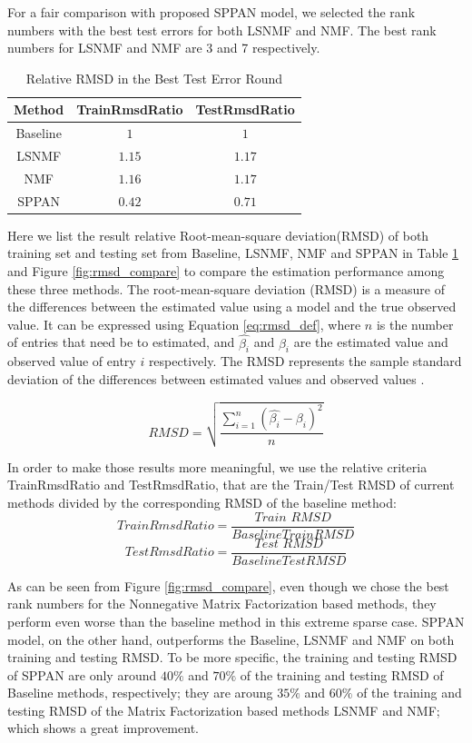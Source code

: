 For a fair comparison with proposed SPPAN model, we selected the rank
numbers with the best test errors for both LSNMF and NMF. The best
rank numbers for LSNMF and NMF are 3 and 7 respectively.

\begin{table}[!ht]
\centering
\begin{tabular}{|c|c|c|}
  \hline	\hline
  Method &  TrainRmsdRatio&TestRmsdRatio\\ \hline
  Baseline  & $1$  & $1$\\ 
  LSNMF & $1.15$  & $1.17$\\ 
  NMF  & $1.16$  & $1.17$ \\ 
  SPPAN  & $0.42$  & $0.71$\\ \hline
\end{tabular}
\caption{Relative RMSD in the Best Test Error Round}
\label{tab:rmsd_compare}
\end{table}

Here we list the result relative Root-mean-square deviation(RMSD) of
both training set and testing set from Baseline, LSNMF, NMF and SPPAN
in Table \ref{tab:rmsd_compare} and Figure \ref{fig:rmsd_compare} to
compare the estimation performance among these three methods.  The
root-mean-square deviation (RMSD) is a measure of the differences
between the estimated value using a model and the true observed
value. It can be expressed using Equation \ref{eq:rmsd_def}, where $n$
is the number of entries that need be to estimated, and
$\hat{\beta_i}$ and $\beta_i$ are the estimated value and observed
value of entry $i$ respectively. The RMSD represents the sample
standard deviation of the differences between estimated values and
observed values \cite{hyndman2006another}.

\begin{equation}
\label{eq:rmsd_def}
RMSD=\sqrt{\frac{\sum\limits_{i=1}^{n}(\hat{\beta_i}-\beta_i)^2}{n}}
\end{equation}

In order to make those results more meaningful, we use the relative
criteria TrainRmsdRatio and TestRmsdRatio, that are the Train/Test
RMSD of current methods divided by the corresponding RMSD of the
baseline method:
\[
TrainRmsdRatio=\frac{\textit{Train RMSD}}{Baseline Train RMSD}
\]
\[
TestRmsdRatio=\frac{\textit{Test RMSD}}{Baseline Test RMSD}
\]

As can be seen from Figure \ref{fig:rmsd_compare}, even though we
chose the best rank numbers for the Nonnegative Matrix Factorization
based methods, they perform even worse than the baseline method in
this extreme sparse case. SPPAN model, on the other hand, outperforms
the Baseline, LSNMF and NMF on both training and testing RMSD. To be
more specific, the training and testing RMSD of SPPAN are only around
$40\%$ and $70\%$ of the training and testing RMSD of Baseline
methods, respectively; they are aroung $35\%$ and $60\%$ of the
training and testing RMSD of the Matrix Factorization based methods
LSNMF and NMF; which shows a great improvement.

